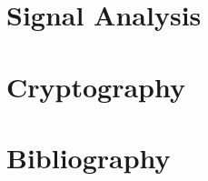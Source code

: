 \documentclass{../mathhomework}
\begin{document}
\maketitle

\pagebreak

\section{Signal Analysis}

\pagebreak

\section{Cryptography}

\pagebreak

\section{Bibliography}
\end{document}
